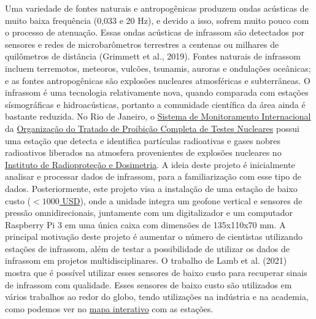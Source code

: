 \documentclass[10pt,a4paper,oneside]{book}
\begin{document}
Uma variedade de fontes naturais e antropogênicas produzem ondas acústicas de muito baixa frequência (0,033 e 20 Hz), e devido a isso, sofrem muito pouco com o processo de atenuação. Essas ondas acústicas de infrassom são detectados por sensores e redes de microbarômetros terrestres a centenas ou milhares de quilômetros de distância (Grimmett et al., 2019). Fontes naturais de infrassom incluem terremotos, meteoros, vulcões, tsunamis, auroras e ondulações oceânicas; e as fontes antropogênicas são explosões nucleares atmosféricas e subterrâneas. O infrassom é uma tecnologia relativamente nova, quando comparada com estações sísmográficas e hidroacústicas, portanto a comunidade científica da área ainda é bastante reduzida. No Rio de Janeiro, o \href{https://www.ctbto.org/our-work/international-monitoring-system}{Sistema de Monitoramento Internacional} da \href{https://funag.gov.br/biblioteca/download/934-Tratado_de_Proibicao_Completa_dos_Testes_Nucleares_CTBT.pdf}{Organização do Tratado de Proibição Completa de Testes Nucleares} possui uma estação que detecta e identifica partículas radioativas e gases nobres radioativos liberados na atmosfera provenientes de explosões nucleares no \href{https://www.gov.br/ird/pt-br/assuntos/noticias/noticias-2021/ird-sedia-estacao-de-monitoramento-global-capaz-de-detectar-materiais-radioativos-liberados-na-atmosfera}{Instituto de Radioproteção e Dosimetria}. A ideia deste projeto é inicialmente analisar e processar dados de infrassom, para a familiarização com esse tipo de dados. Posteriormente, este projeto visa a instalação de uma estação de baixo custo (\href{https://shop.raspberryshake.org/product/turnkey-iot-atmospheric-infrasound-monitor-rsboom/?attribute_pa_variation=indoor\&attribute_pa_license=private-use-125-discount}{$< 1000$ USD}), onde a unidade integra um geofone vertical e sensores de pressão omnidirecionais, juntamente com um digitalizador e um computador Raspberry Pi 3 em uma única caixa com dimensões de 135x110x70 mm. A principal motivação deste projeto é aumentar o número de cientistas utilizando estações de infrassom, além de testar a possibilidade de utilizar os dados de infrassom em projetos multidisciplinares. O trabalho de Lamb et al. (2021) mostra que é possível utilizar esses sensores de baixo custo para recuperar sinais de infrassom com qualidade. Esses sensores de baixo custo são utilizados em vários trabalhos ao redor do globo, tendo utilizações na indústria e na academia, como podemos ver no \href{https://stationview.raspberryshake.org/}{mapa interativo} com as estações. 
\end{document}
